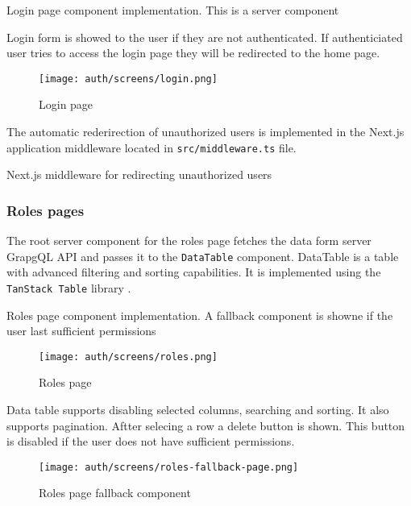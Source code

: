 \documentclass[../main.tex]{subfiles}
\begin{document}
\begin{listing}[H]
  \caption{Login page component implementation. This is a server component}
\end{listing}

Login form is showed to the user if they are not authenticated.
If authenticiated user tries to access the login page they will be redirected to the home page.

\begin{figure}[H]
  \centering
  \texttt{[image: auth/screens/login.png]}
  \caption{Login page}
\end{figure}

The automatic rederirection of unauthorized users is implemented in the Next.js application middleware located in \texttt{src/middleware.ts} file.

\begin{listing}[H]
  \caption{Next.js middleware for redirecting unauthorized users}
\end{listing}

\subsubsection{Roles pages}

The root server component for the roles page fetches the data form server GrapgQL API and passes it to the \texttt{DataTable} component.
DataTable is a table with advanced filtering and sorting capabilities. It is implemented using the \texttt{TanStack Table} library \cite{tanstack-table}.

\begin{listing}[H]
  \caption{Roles page component implementation. A fallback component is showne if the user last sufficient permissions}
\end{listing}

\begin{figure}[H]
  \centering
  \texttt{[image: auth/screens/roles.png]}
  \caption{Roles page}
\end{figure}

Data table supports disabling selected columns, searching and sorting. It also supports pagination.
Aftter selecing a row a delete button is shown. This button is disabled if the user does not have sufficient permissions.

\begin{figure}[H]
  \centering
  \texttt{[image: auth/screens/roles-fallback-page.png]}
  \caption{Roles page fallback component}
\end{figure}
\end{document}
